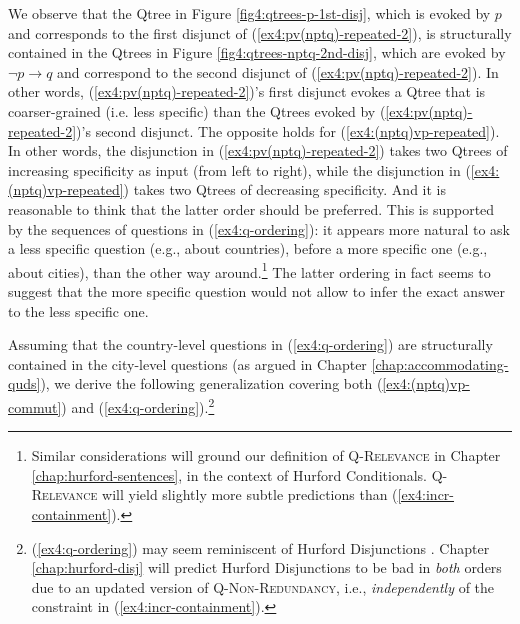 We observe that the Qtree in Figure \ref{fig4:qtrees-p-1st-disj}, which is evoked by $p$ and corresponds to the first disjunct of (\ref{ex4:pv(nptq)-repeated-2}), is structurally contained in the Qtrees in Figure \ref{fig4:qtrees-nptq-2nd-disj}, which are evoked by $\neg p \rightarrow q$ and correspond to the second disjunct of (\ref{ex4:pv(nptq)-repeated-2}). In other words, (\ref{ex4:pv(nptq)-repeated-2})'s first disjunct evokes a Qtree that is coarser-grained (i.e. less specific) than the Qtrees evoked by (\ref{ex4:pv(nptq)-repeated-2})'s second disjunct. The opposite holds for (\ref{ex4:(nptq)vp-repeated}). In other words, the disjunction in (\ref{ex4:pv(nptq)-repeated-2}) takes two Qtrees of increasing specificity as input (from left to right), while the disjunction in (\ref{ex4:(nptq)vp-repeated}) takes two Qtrees of decreasing specificity. And it is reasonable to think that the latter order should be preferred. This is supported by the sequences of questions in (\ref{ex4:q-ordering}): it appears more natural to ask a less specific question (e.g., about countries), before a more specific one (e.g., about cities), than the other way around.\footnote{Similar considerations will ground our definition of \textsc{Q-Relevance} in Chapter \ref{chap:hurford-sentences}, in the context of Hurford Conditionals. \textsc{Q-Relevance} will yield slightly more subtle predictions than (\ref{ex4:incr-containment}).} The latter ordering in fact seems to suggest that the more specific question would not allow to infer the exact answer to the less specific one.

\begin{exe}
	\ex \label{ex4:q-ordering}
	\begin{xlist}
	\end{xlist}
\end{exe} 

Assuming that the country-level questions in (\ref{ex4:q-ordering}) are structurally contained in the city-level questions (as argued in Chapter \ref{chap:accommodating-quds}), we derive the following generalization covering both (\ref{ex4:(nptq)vp-commut}) and (\ref{ex4:q-ordering}).\footnote{(\ref{ex4:q-ordering}) may seem reminiscent of Hurford Disjunctions \parencite{Hurford1974}. Chapter \ref{chap:hurford-disj} will predict Hurford Disjunctions to be bad in \textit{both} orders due to an updated version of \textsc{Q-Non-Redundancy}, i.e., \textit{independently} of the constraint in (\ref{ex4:incr-containment}).}

